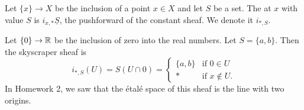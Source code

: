 \begin{defn}
    Let $\{x\} \to X$ be the inclusion of a point $x \in X$ and let \(S\) be a set. The  at $x$ with value $S$ is $i_{x,*}\underline{S}$, the pushforward of the constant sheaf. We denote it $i_{*, S}$.
\end{defn}

\begin{exmp}
    Let $\{0\} \to \mathbb{R}$ be the inclusion of zero into the real numbers. Let $S = \{a,b\}$. Then the skyscraper sheaf is
    \[
        i_{*,S}(U) = S(U \cap 0) =     \begin{cases}
        \{a,b\} & \text{if } 0 \in U\\
        * & \text{if } x \notin U.
    \end{cases}
    \]
    In Homework 2, we saw that the étalé space of this sheaf is the line with two origins.
\end{exmp}

